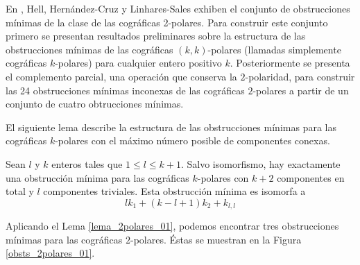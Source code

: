 En \cite{Hell03}, Hell, Hern\'andez-Cruz y Linhares-Sales
exhiben el conjunto de obstrucciones mínimas de la clase
de las cográficas 2-polares. Para construir este conjunto
primero se presentan resultados preliminares sobre la
estructura de las obstrucciones mínimas de las cográficas
$(k,k)$-polares (llamadas simplemente cográficas $k$-polares)
para cualquier entero positivo $k$. Posteriormente se presenta
el complemento parcial, una operación que conserva la
$2$-polaridad, para construir las 24 obstrucciones m\'inimas
inconexas de las cogr\'aficas $2$-polares a partir de un
conjunto de cuatro obtrucciones m\'inimas.

El siguiente lema describe la estructura de las
obstrucciones m\'inimas para las cogr\'aficas
$k$-polares con el m\'aximo n\'umero posible de
componentes conexas.

\begin{lemma}
\label{lema_2polares_01}
Sean $l$ y $k$ enteros tales que $1 \le l \le k+1$. Salvo isomorfismo, hay exactamente una obstrucción mínima para las cográficas $k$-polares con $k+2$ componentes en total y $l$ componentes triviales. Esta obstrucción mínima es isomorfa a
$$lk_1+(k-l+1)k_2+k_{l,l}$$
\end{lemma}

Aplicando el Lema \ref{lema_2polares_01}, podemos encontrar
tres obstrucciones mínimas para las cográficas $2$-polares.
Éstas se muestran en la Figura \ref{obsts_2polares_01}.

